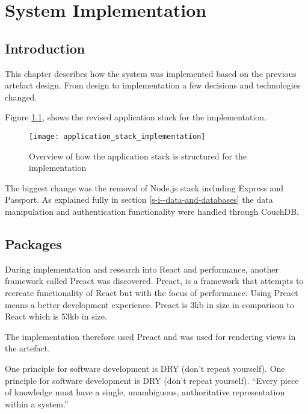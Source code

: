 \chapter{System Implementation} \label{s-i}

\section{Introduction} \label{s-i--introduction}

This chapter describes how the system was implemented based on the previous artefact design. From design to implementation a few decisions and technologies changed.

Figure \ref{figure-application-stack-implementation}, shows the revised application stack for the implementation.

\begin{figure}[H]
  \centering
    \texttt{[image: application\_stack\_implementation]}
  \caption{Overview of how the application stack is structured for the implementation}
  \label{figure-application-stack-implementation}
\end{figure}

The biggest change was the removal of Node.js stack including Express and Passport. As explained fully in section \ref{s-i--data-and-databases} the data manipulation and authentication functionality were handled through CouchDB.

\section{Packages} \label{s-i--packages}

During implementation and research into React and performance, another framework called Preact was discovered. Preact, is a framework that attempts to recreate functionality of React but with the focus of performance. Using Preact means a better development experience. \cite{preact} Preact is 3kb in size in comparison to React which is 53kb in size.

The implementation therefore used Preact and was used for rendering views in the artefact.

One principle for software development is DRY (don't repeat yourself). One principle for software development is DRY (don't repeat yourself). ``Every piece of knowledge must have a single, unambiguous, authoritative representation within a system.'' \cite{DRY}

